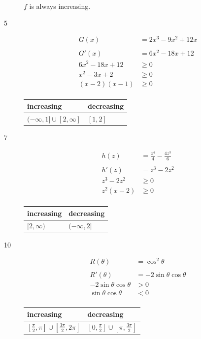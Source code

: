 \documentclass[fleqn]{exam}
\begin{document}
\begin{description}
$f$ is always increasing.

\item[5]
\begin{align*}
  G(x) &= 2x^3 - 9x^2 + 12x \\
\\
  G'(x) & = 6x^2 - 18x + 12 \\
  6x^2 - 18x + 12 &\geq 0 \\
  x^2 - 3x + 2 &\geq 0 \\
  (x - 2)(x - 1) &\geq 0 \\
\end{align*}

\begin{tabular}{ll}
\toprule
increasing & decreasing \\
\midrule
$( -\infty, 1] \cup [2, \infty]$ & $[1, 2]$ \\
\bottomrule
\end{tabular}

\item[7]
\begin{align*}
  h(z) &= \frac{z^4}{4} - \frac{4z^3}{6} \\
\\
  h'(z) & = z^3 - 2z^2 \\
  z^3 - 2z^2 &\geq 0 \\
  z^2(x - 2) &\geq 0 \\
\end{align*}

\begin{tabular}{ll}
\toprule
increasing & decreasing  \\
\midrule
$[2, \infty)$ & $( -\infty, 2]$ \\
\bottomrule
\end{tabular}

\pagebreak

\item[10]
\begin{align*}
  R(\theta) &= \cos^2 \theta \\
\\
  R'(\theta) &= -2 \sin \theta \cos \theta \\
  -2 \sin \theta \cos \theta &> 0 \\
   \sin \theta \cos \theta   &< 0 \\
\end{align*}

\begin{tabular}{ll}
\toprule
increasing & decreasing \\
\midrule
$\left[ \frac{\pi}{2}, \pi \right] \cup \left[ \frac{3 \pi}{2}, 2 \pi \right]$ 
  & $\left[0, \frac{\pi}{2} \right] \cup \left[ \pi, \frac{3 \pi}{2} \right]$ \\
\bottomrule
\end{tabular}


\end{description}
\end{document}
